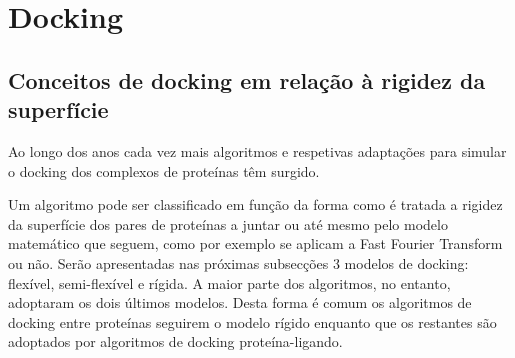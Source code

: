 %



\section{Docking}
\subsection{Conceitos de docking em relação à rigidez da superfície}
\label{classi}
Ao longo dos anos cada vez mais algoritmos e respetivas adaptações para simular o docking dos complexos de proteínas têm surgido. 
																								
Um algoritmo pode ser classificado em função da forma como é tratada a rigidez da superfície dos pares de proteínas a juntar ou até mesmo pelo modelo matemático que seguem, como por exemplo se aplicam a Fast Fourier Transform ou não.
Serão apresentadas nas próximas subsecções 3 modelos de docking: flexível, semi-flexível e rígida. A maior parte dos algoritmos, no entanto, adoptaram os dois últimos modelos. Desta forma é comum os algoritmos de docking entre proteínas seguirem o modelo rígido enquanto que os restantes são adoptados por algoritmos de docking proteína-ligando. %

